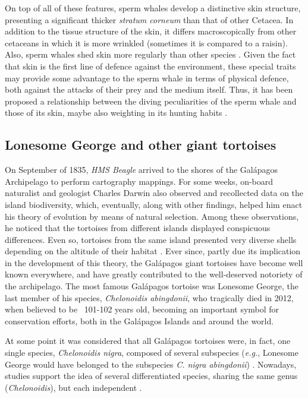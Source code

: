 On top of all of these features, sperm whales develop a distinctive skin structure, presenting a significant thicker \textsl{stratum corneum} than that of other Cetacea.
In addition to the tissue structure of the skin, it differs macroscopically from other cetaceans in which it is more wrinkled (sometimes it is compared to a raisin).
Also, sperm whales shed skin more regularly than other species \cite{Sokolov1982}.
Given the fact that skin is the first line of defence against the environment, these special traits may provide some advantage to the sperm whale in terms of physical defence, both against the attacks of their prey and the medium itself.
Thus, it has been proposed a relationship between the diving peculiarities of the sperm whale and those of its skin, maybe also weighting in its hunting habits \cite{Strauss1969}.

\subsection{Lonesome George and other giant tortoises} \label{ss_intro_models_giant_tortoises}

On September of 1835, \textsl{HMS Beagle} arrived to the shores of the Gal\'{a}pagos Archipelago to perform cartography mappings.
For some weeks, on-board naturalist and geologist Charles Darwin also observed and recollected data on the island biodiversity, which, eventually, along with other findings, helped him enact his theory of evolution by means of natural selection.
Among these observations, he noticed that the tortoises from different islands displayed conspicuous differences.
Even so, tortoises from the same island presented very diverse shells depending on the altitude of their habitat \cite{Darwin1845}.
Ever since, partly due its implication in the development of this theory, the Gal\'{a}pagos giant tortoises have become well known everywhere, and have greatly contributed to the well-deserved notoriety of the archipelago.
The most famous Gal\'{a}pagos tortoise was Lonesome George, the last member of his species, \textit{Chelonoidis abingdonii}, who tragically died in 2012, when believed to be ~101-102 years old, becoming an important symbol for conservation efforts, both in the Gal\'{a}pagos Islands and around the world.

At some point it was considered that all Gal\'{a}pagos tortoises were, in fact, one single species, \textit{Chelonoidis nigra}, composed of several subspecies (\textit{e.g.}, Lonesome George would have belonged to the subspecies \textit{C. nigra abingdonii}) \cite{Caccone1999}.
Nowadays, studies support the idea of several differentiated species, sharing the same genus (\textit{Chelonoidis}), but each independent \cite{Le2006}.

